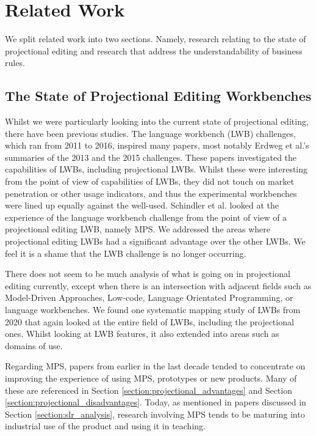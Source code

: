 \chapter{Related Work}
\label{chapter:RelatedWork}

We split related work into two sections. 
Namely, research relating to the state of projectional editing and research that address the understandability of business rules.

\section{The State of Projectional Editing Workbenches}

Whilst we were particularly looking into the current state of projectional editing, there have been previous studies.
The language workbench (LWB) challenges, which ran from 2011 to 2016, inspired many papers, most notably Erdweg et al.'s summaries of the 2013\cite{erdweg2013state} and the 2015\cite{erdweg2015evaluating} challenges.
These papers investigated the capabilities of LWBs, including projectional LWBs.
Whilst these were interesting from the point of view of capabilities of LWBs, they did not touch on market penetration or other usage indicators, and thus the experimental workbenches were lined up equally against the well-used.
Schindler et al.\cite{schindler2016language} looked at the experience of the language workbench challenge from the point of view of a projectional editing LWB, namely MPS.
We addressed the areas where projectional editing LWBs had a significant advantage over the other LWBs. 
We feel it is a shame that the LWB challenge is no longer occurring.

There does not seem to be much analysis of what is going on in projectional editing currently, except when there is an intersection with adjacent fields such as Model-Driven Approaches, Low-code, Language Orientated Programming, or language workbenches.
We found one systematic mapping study of LWBs\cite{iung2020systematic} from 2020 that again looked at the entire field of LWBs, including the projectional ones.
Whilst looking at LWB features, it also extended into areas such as domains of use.

Regarding MPS, papers from earlier in the last decade tended to concentrate on improving the experience of using MPS, prototypes or new products.
Many of these are referenced in Section \ref{section:projectional_advantages} and Section \ref{section:projectional_disadvantages}.
Today, as mentioned in papers discussed in Section \ref{section:slr_analysis}, research involving MPS tends to be maturing into industrial use of the product and using it in teaching.

